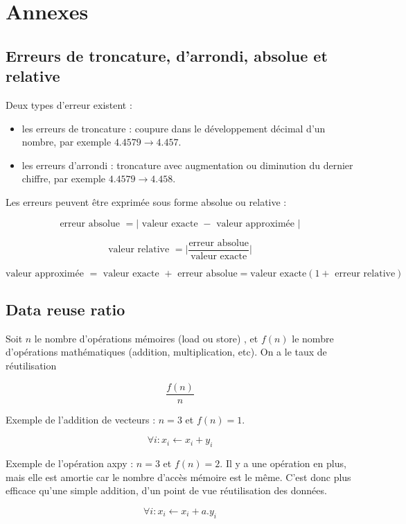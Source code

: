 \chapter{Annexes}

\section{Erreurs de troncature, d'arrondi, absolue et relative}

Deux types d'erreur existent :

\begin{itemize}
	\item les erreurs de troncature : coupure dans le développement décimal d'un nombre, par exemple $4.4579 \rightarrow 4.457$.
	\item les erreurs d'arrondi : troncature avec augmentation ou diminution du dernier chiffre, par exemple $4.4579 \rightarrow 4.458$.
\end{itemize}

Les erreurs peuvent être exprimée sous forme absolue ou relative :

$$\text{erreur absolue } = \vert \text{ valeur exacte } - \text{ valeur approximée } \vert$$

$$\text{valeur relative } = \vert\frac{\text{erreur absolue}}{\text{valeur exacte}}\vert$$

$$\text{valeur approximée } = \text{ valeur exacte } + \text{ erreur absolue} = \text{valeur exacte} (1 + \text{ erreur relative})$$


\section{Data reuse ratio}

Soit $n$ le nombre d'opérations mémoires (load ou store) , et $f(n)$ le nombre d'opérations mathématiques (addition, multiplication, etc). On a le taux de réutilisation

$$\frac{f(n)}{n}$$

Exemple de l'addition de vecteurs : $n = 3$ et $f(n) = 1$.

$$\forall i : x_i \leftarrow x_i + y_i$$
	
Exemple de l'opération axpy : $n = 3$ et $f(n) = 2$. Il y a une opération en plus, mais elle est amortie car le nombre d'accès mémoire est le même. C'est donc plus efficace qu'une simple addition, d'un point de vue réutilisation des données.

$$\forall i : x_i \leftarrow x_i + a . y_i$$
	
